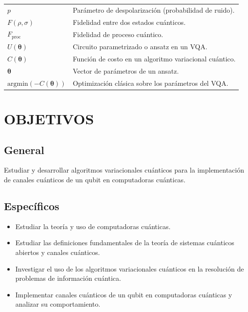 \documentclass[letterpaper,12pt]{thesisECFM}
\theoremstyle{plain}
\theoremstyle{definition}
\theoremstyle{definition}
\theoremstyle{remark}
\newcommand{\1}{\mathbb{1}}
\begin{document}
\begin{longtable}{@{}p{4cm}p{11cm}@{}}
$p$ & Parámetro de despolarización (probabilidad de ruido).\\[6pt]
$F(\rho, \sigma)$ & Fidelidad entre dos estados cuánticos.\\[6pt]
$F_{\text{proc}}$ & Fidelidad de proceso cuántico.\\[6pt]
$U(\bm{\theta})$ & Circuito parametrizado o ansatz en un VQA.\\[6pt]
$C(\bm{\theta})$ & Función de costo en un algoritmo variacional cuántico.\\[6pt]
$\bm{\theta}$ & Vector de parámetros de un ansatz.\\[6pt]
$\text{argmin}(-C(\bm{\theta}))$ & Optimización clásica sobre los parámetros del VQA.\\
\end{longtable}




\chapter*{OBJETIVOS} %
{}
\section*{General} 
Estudiar y desarrollar algoritmos variacionales cuánticos para la implementación de canales cuánticos de un  qubit en computadoras cuánticas.

\section*{Específicos}
\begin{itemize}
    \item Estudiar la teoría y uso de computadoras cuánticas.
    \item Estudiar las definiciones fundamentales de la teoría de sistemas cuánticos abiertos y canales cuánticos.
    \item Investigar el uso de los algoritmos variacionales cuánticos en la resolución de problemas de información cuántica.
    \item Implementar canales cuánticos de un qubit en computadoras cuánticas y analizar su comportamiento.
\end{itemize}
\end{document}
